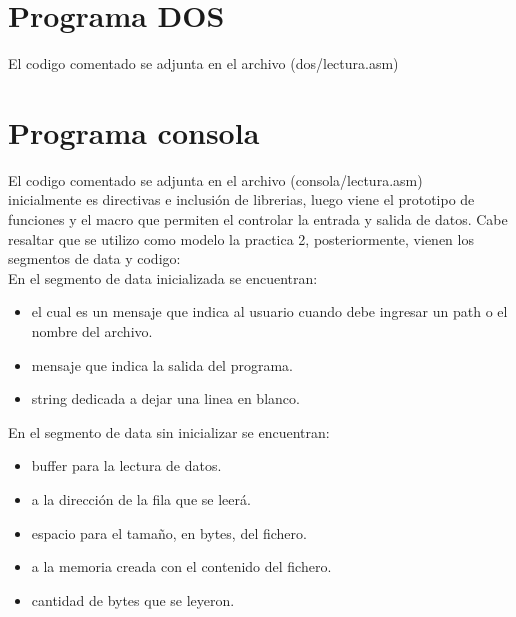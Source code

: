 


\section{Programa DOS}

El codigo comentado se adjunta en el archivo (dos/lectura.asm)




\section{Programa consola}

El codigo comentado se adjunta en el archivo (consola/lectura.asm)\\



inicialmente es directivas e inclusión de librerias, luego viene el prototipo
de funciones y el macro que permiten el controlar la entrada y salida de datos.
Cabe resaltar que se utilizo como modelo la practica 2, posteriormente,
vienen los segmentos de data y codigo:\\


En el segmento de data inicializada  se encuentran:

\begin{itemize}
    \item {} el cual es un mensaje que indica al usuario cuando
        debe ingresar un path o el nombre del archivo.

    \item {} mensaje que indica la salida del programa.

    \item {} string dedicada a dejar una linea en blanco.
\end{itemize}

\vspace{0.5cm}

En el segmento de data sin inicializar  se encuentran:

\begin{itemize}
    \item {} buffer para la lectura de datos.

    \item {}  a la dirección de la fila que se
        leerá.

    \item {} espacio para el tamaño, en bytes, del fichero.

    \item {}  a la memoria creada con el contenido
        del fichero.

    \item {} cantidad de bytes que se leyeron.

\end{itemize}

